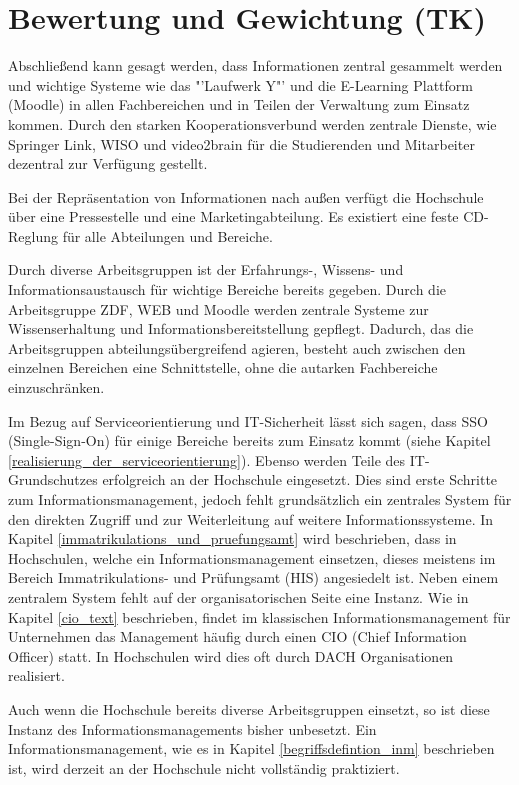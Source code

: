 \section{Bewertung und Gewichtung (TK)}
Abschließend kann gesagt werden, dass Informationen zentral gesammelt werden und wichtige Systeme wie das "'Laufwerk Y"' und die E-Learning Plattform (Moodle) in allen Fachbereichen und in Teilen der Verwaltung zum Einsatz kommen. Durch den starken Kooperationsverbund werden zentrale Dienste, wie Springer Link, WISO und video2brain für die Studierenden und Mitarbeiter dezentral zur Verfügung gestellt. 

Bei der Repräsentation von Informationen nach außen verfügt die Hochschule über eine Pressestelle und eine Marketingabteilung. Es existiert eine feste CD-Reglung für alle Abteilungen und Bereiche. 

Durch diverse Arbeitsgruppen ist der Erfahrungs-, Wissens- und Informationsaustausch für wichtige Bereiche bereits gegeben. Durch die Arbeitsgruppe ZDF, WEB und Moodle werden zentrale Systeme zur Wissenserhaltung und Informationsbereitstellung gepflegt. Dadurch, das die Arbeitsgruppen abteilungsübergreifend agieren, besteht auch zwischen den einzelnen Bereichen eine Schnittstelle, ohne die autarken Fachbereiche einzuschränken. 

Im Bezug auf Serviceorientierung und IT-Sicherheit lässt sich sagen, dass SSO (Single-Sign-On) für einige Bereiche bereits zum Einsatz kommt (siehe Kapitel \ref{realisierung_der_serviceorientierung}). Ebenso werden Teile des IT-Grundschutzes erfolgreich an der Hochschule eingesetzt. Dies sind erste Schritte zum Informationsmanagement, jedoch fehlt grundsätzlich ein zentrales System für den direkten Zugriff und zur Weiterleitung auf weitere Informationssysteme. In Kapitel \ref{immatrikulations_und_pruefungsamt} wird beschrieben, dass in Hochschulen, welche ein Informationsmanagement einsetzen, dieses meistens im Bereich Immatrikulations- und Prüfungsamt (HIS) angesiedelt ist. 
Neben einem  zentralem System fehlt auf der organisatorischen Seite eine Instanz. Wie in Kapitel \ref{cio_text} beschrieben, findet im klassischen Informationsmanagement für Unternehmen das Management häufig durch einen CIO (Chief Information Officer) statt. In Hochschulen wird dies oft durch DACH Organisationen realisiert. 

Auch wenn die Hochschule bereits diverse Arbeitsgruppen einsetzt, so ist diese Instanz des Informationsmanagements bisher unbesetzt. Ein Informationsmanagement, wie es in Kapitel \ref{begriffsdefintion_inm} beschrieben ist, wird derzeit an der Hochschule nicht vollständig praktiziert.